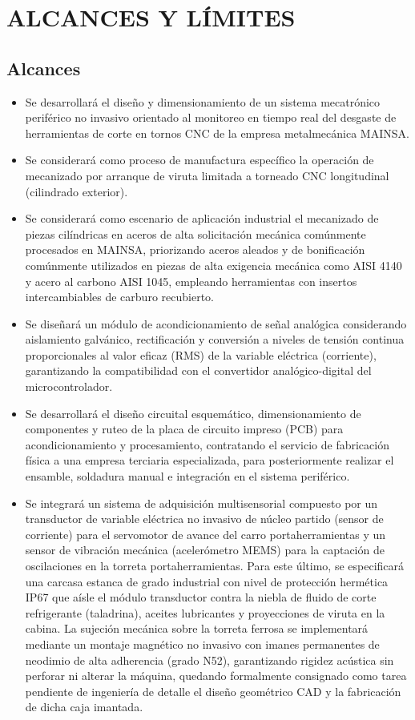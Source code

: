 \newpage
\section{ALCANCES Y LÍMITES}

\subsection{Alcances}

\begin{itemize}
\setlength{\itemsep}{2.5pt}
\setlength{\parsep}{1pt}
\item Se desarrollará el diseño y dimensionamiento de un sistema mecatrónico periférico no invasivo orientado al monitoreo en tiempo real del desgaste de herramientas de corte en tornos CNC de la empresa metalmecánica MAINSA.
\item Se considerará como proceso de manufactura específico la operación de mecanizado por arranque de viruta limitada a torneado CNC longitudinal (cilindrado exterior).
\item Se considerará como escenario de aplicación industrial el mecanizado de piezas cilíndricas en aceros de alta solicitación mecánica comúnmente procesados en MAINSA, priorizando aceros aleados y de bonificación comúnmente utilizados en piezas de alta exigencia mecánica como AISI 4140 y acero al carbono AISI 1045, empleando herramientas con insertos intercambiables de carburo recubierto.
\item Se diseñará un módulo de acondicionamiento de señal analógica considerando aislamiento galvánico, rectificación y conversión a niveles de tensión continua proporcionales al valor eficaz (RMS) de la variable eléctrica (corriente), garantizando la compatibilidad con el convertidor analógico-digital del microcontrolador.
\item Se desarrollará el diseño circuital esquemático, dimensionamiento de componentes y ruteo de la placa de circuito impreso (PCB) para acondicionamiento y procesamiento, contratando el servicio de fabricación física a una empresa terciaria especializada, para posteriormente realizar el ensamble, soldadura manual e integración en el sistema periférico.
\item Se integrará un sistema de adquisición multisensorial compuesto por un transductor de variable eléctrica no invasivo de núcleo partido (sensor de corriente) para el servomotor de avance del carro portaherramientas y un sensor de vibración mecánica (acelerómetro MEMS) para la captación de oscilaciones en la torreta portaherramientas. Para este último, se especificará una carcasa estanca de grado industrial con nivel de protección hermética IP67 que aísle el módulo transductor contra la niebla de fluido de corte refrigerante (taladrina), aceites lubricantes y proyecciones de viruta en la cabina. La sujeción mecánica sobre la torreta ferrosa se implementará mediante un montaje magnético no invasivo con imanes permanentes de neodimio de alta adherencia (grado N52), garantizando rigidez acústica sin perforar ni alterar la máquina, quedando formalmente consignado como tarea pendiente de ingeniería de detalle el diseño geométrico CAD y la fabricación de dicha caja imantada.

\end{itemize}
